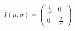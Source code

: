 \documentclass[preview]{standalone}
\begin{document}
\begin{align*}
I(\mu, \sigma) = \begin{pmatrix} \frac{1}{\sigma^2} & 0 \\ 0 & \frac{2}{\sigma^2} \end{pmatrix}
\end{align*}
\end{document}
